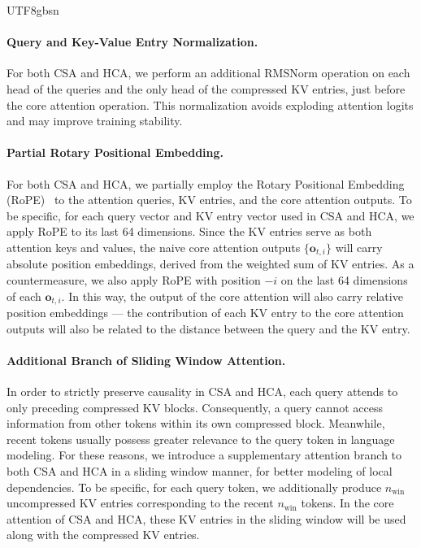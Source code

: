 \documentclass[11pt, a4paper, logo, copyright, nonumbering]{deepseek}
\newcommand{\hca}{HCA}
\newcommand{\csa}{CSA}
\begin{document}
\begin{CJK*}{UTF8}{gbsn}
\paragraph{Query and Key-Value Entry Normalization.}
For both \csa{} and \hca{}, we perform an additional RMSNorm operation on each head of the queries and the only head of the compressed KV entries, just before the core attention operation. 
This normalization avoids exploding attention logits and may improve training stability. 

\paragraph{Partial Rotary Positional Embedding.}
For both \csa{} and \hca{}, we partially employ the Rotary Positional Embedding (RoPE)~\citep{su2024roformer} to the attention queries, KV entries, and the core attention outputs. 
To be specific, for each query vector and KV entry vector used in \csa{} and \hca{}, we apply RoPE to its last 64 dimensions. 
Since the KV entries serve as both attention keys and values, the naive core attention outputs $\{\mathbf{o}_{t,i}\}$ will carry absolute position embeddings, derived from the weighted sum of KV entries. 
As a countermeasure, we also apply RoPE with position $-i$ on the last 64 dimensions of each $\mathbf{o}_{t,i}$. 
In this way, the output of the core attention will also carry relative position embeddings --- the contribution of each KV entry to the core attention outputs will also be related to the distance between the query and the KV entry.

\paragraph{Additional Branch of Sliding Window Attention.}
In order to strictly preserve causality in \csa{} and \hca{}, each query attends to only preceding compressed KV blocks. 
Consequently, a query cannot access information from other tokens within its own compressed block.
Meanwhile, recent tokens usually possess greater relevance to the query token in language modeling.
For these reasons, we introduce a supplementary attention branch to both \csa{} and \hca{} in a sliding window manner, for better modeling of local dependencies.
To be specific, for each query token, we additionally produce $n_{\text{win}}$ uncompressed KV entries corresponding to the recent $n_{\text{win}}$ tokens. 
In the core attention of \csa{} and \hca{}, these KV entries in the sliding window will be used along with the compressed KV entries. 


\end{CJK*}
\end{document}
